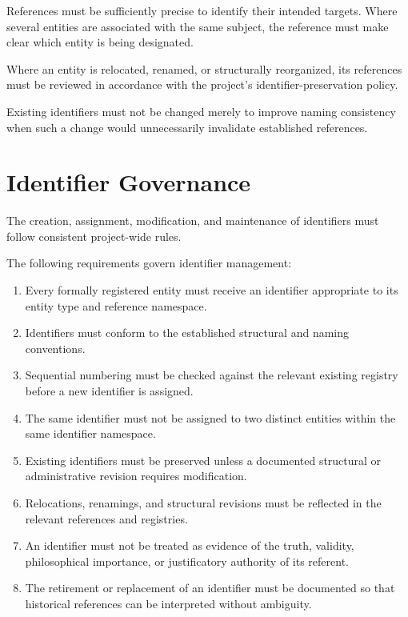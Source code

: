 References must be sufficiently precise to identify
their intended targets. Where several entities are
associated with the same subject, the reference must
make clear which entity is being designated.

Where an entity is relocated, renamed, or structurally
reorganized, its references must be reviewed in accordance
with the project's identifier-preservation policy.

Existing identifiers must not be changed merely to
improve naming consistency when such a change would
unnecessarily invalidate established references.



\section*{Identifier Governance}

The creation, assignment, modification, and maintenance
of identifiers must follow consistent project-wide rules.

The following requirements govern identifier management:

\begin{enumerate}
    \item Every formally registered entity must receive
          an identifier appropriate to its entity type
          and reference namespace.

    \item Identifiers must conform to the established
          structural and naming conventions.

    \item Sequential numbering must be checked against
          the relevant existing registry before a new
          identifier is assigned.

    \item The same identifier must not be assigned to
          two distinct entities within the same
          identifier namespace.

    \item Existing identifiers must be preserved unless
          a documented structural or administrative
          revision requires modification.

    \item Relocations, renamings, and structural revisions
          must be reflected in the relevant references
          and registries.

    \item An identifier must not be treated as evidence
          of the truth, validity, philosophical importance,
          or justificatory authority of its referent.

    \item The retirement or replacement of an identifier
          must be documented so that historical references
          can be interpreted without ambiguity.
\end{enumerate}

